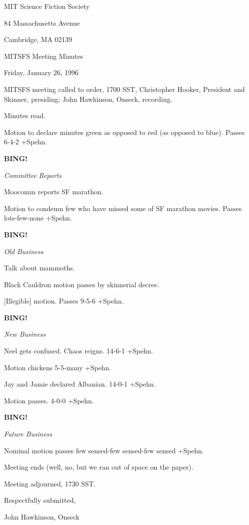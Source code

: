 \documentclass[12pt]{article}
\newcommand{\bing}{{\bf BING!} }
\newcommand{\goto}[1]{\bing \vskip 12pt \centerline{{\em{#1}}}}
\begin{document}
\begin{center}

MIT Science Fiction Society 

84 Massachusetts Avenue

Cambridge, MA 02139

\vspace{12pt}

MITSFS Meeting Minutes 

Friday, January 26, 1996

\end{center}
 
\vspace{18pt}

\setlength{\parskip}{6pt}

\noindent
MITSFS meeting called to order, 1700 SST,
Christopher Hooker, President and Skinner, presiding; John Hawkinson, Onseck, recording.

Minutes read.

Motion to declare minutes green as opposed to red (as opposed to blue). Passes 6-4-2 +Spehn.

\goto{Committee Reports}

Moocomm reports SF marathon.

Motion to condemn few who have missed some of SF marathon movies. Passes lots-few-none +Spehn.

\goto{Old Business}

Talk about mammoths.

Black Cauldron motion passes by skinnerial decree.

[Illegible] motion. Passes 9-5-6 +Spehn.

\goto{New Business}

Neel gets confused. Chaos reigns. 14-6-1 +Spehn.

Motion chickens 5-5-many +Spehn.

Jay and Jamie declared Albanian. 14-0-1 +Spehn.

Motion passes. 4-0-0 +Spehn.

\goto{Future Business}

Nominal motion passes few sensed-few sensed-few sensed +Spehn.

Meeting ends (well, no, but we ran out of space on the paper).

\vspace{12pt}

\noindent
Meeting adjourned, 1730 SST.

\vspace{18pt}

\centerline{Respectfully submitted,}
\centerline{John Hawkinson, Onseck}
\end{document}
